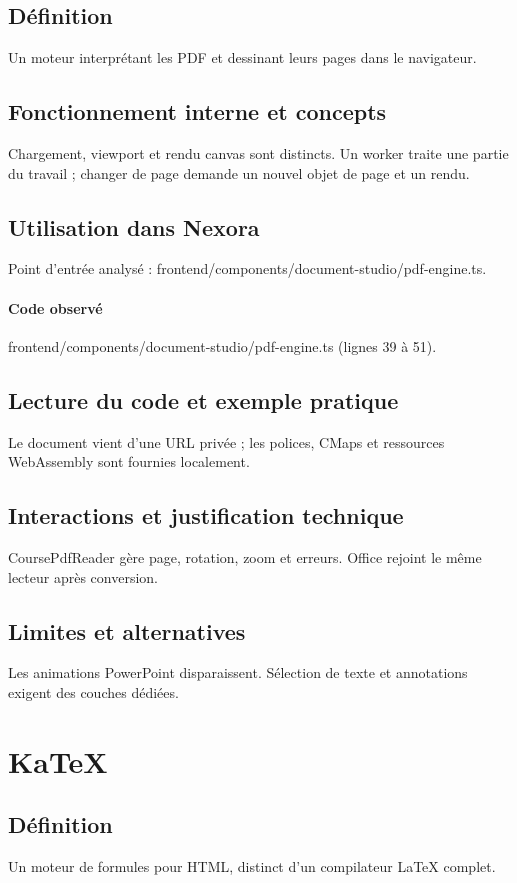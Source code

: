 \subsection*{Définition}
Un moteur interprétant les PDF et dessinant leurs pages dans le navigateur.

\subsection*{Fonctionnement interne et concepts}
Chargement, viewport et rendu canvas sont distincts. Un worker traite une partie du travail ; changer de page demande un nouvel objet de page et un rendu.

\subsection*{Utilisation dans Nexora}
Point d’entrée analysé : frontend/components/document-studio/pdf-engine.ts.

\paragraph{Code observé} frontend/components/document-studio/pdf-engine.ts (lignes 39 à 51).

\subsection*{Lecture du code et exemple pratique}
Le document vient d’une URL privée ; les polices, CMaps et ressources WebAssembly sont fournies localement.

\subsection*{Interactions et justification technique}
CoursePdfReader gère page, rotation, zoom et erreurs. Office rejoint le même lecteur après conversion.

\subsection*{Limites et alternatives}
Les animations PowerPoint disparaissent. Sélection de texte et annotations exigent des couches dédiées.

\section{KaTeX}
\subsection*{Définition}
Un moteur de formules pour HTML, distinct d’un compilateur LaTeX complet.

